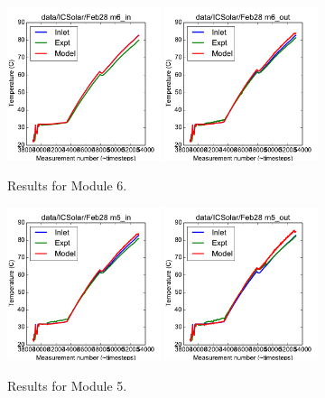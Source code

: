 \documentclass{article}
\begin{document}
\begin{figure}[!ht]
\centering
\includegraphics[width=0.4\textwidth]{../../data/ICSolar/images/Feb28_m6_in_unsteady.pdf}\hspace{0.05\textwidth}
\includegraphics[width=0.4\textwidth]{../../data/ICSolar/images/Feb28_m6_out_unsteady.pdf}\hspace{0.05\textwidth}\\
\caption{Results for Module 6.}\end{figure}
\begin{figure}[!ht]
\centering
\includegraphics[width=0.4\textwidth]{../../data/ICSolar/images/Feb28_m5_in_unsteady.pdf}\hspace{0.05\textwidth}
\includegraphics[width=0.4\textwidth]{../../data/ICSolar/images/Feb28_m5_out_unsteady.pdf}\hspace{0.05\textwidth}\\
\caption{Results for Module 5.}\end{figure}
\end{document}
